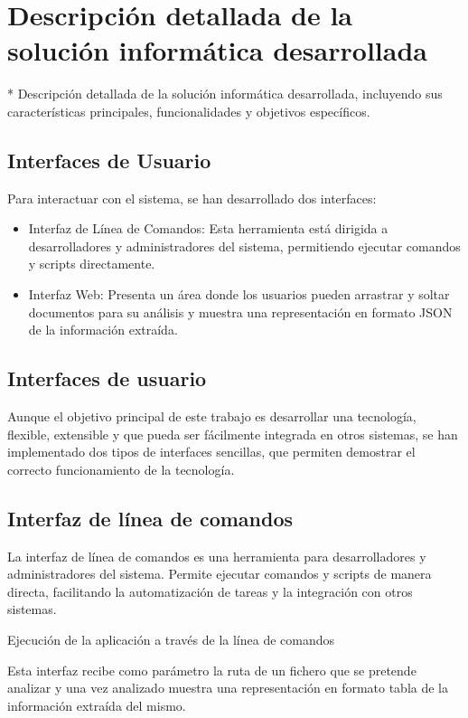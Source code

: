 \section{Descripción detallada de la solución informática desarrollada}

* Descripción detallada de la solución informática desarrollada, incluyendo sus características principales,
funcionalidades y objetivos específicos.


\subsection*{Interfaces de Usuario}
Para interactuar con el sistema, se han desarrollado dos interfaces:

\begin{itemize}
    \item Interfaz de Línea de Comandos: Esta herramienta está dirigida a desarrolladores y
    administradores del sistema, permitiendo ejecutar comandos y scripts directamente.


    \item Interfaz Web: Presenta un área donde los usuarios pueden
    arrastrar y soltar documentos para su análisis y muestra una representación en formato JSON de la información
    extraída.
\end{itemize}


\subsection*{Interfaces de usuario}
Aunque el objetivo principal de este trabajo es desarrollar una tecnología, flexible, extensible y que pueda ser
fácilmente integrada en otros sistemas, se han implementado dos tipos de interfaces sencillas, que permiten demostrar el
correcto funcionamiento de la tecnología.

\subsection*{Interfaz de línea de comandos}
La interfaz de línea de comandos es una herramienta para desarrolladores y administradores del sistema. Permite ejecutar
comandos y scripts de manera directa, facilitando la automatización de tareas y la integración con otros sistemas.


Ejecución de la aplicación a través de la línea de comandos

Esta interfaz recibe como parámetro la ruta de un fichero que se pretende analizar y una vez analizado muestra una
representación en formato tabla de la información extraída del mismo.


